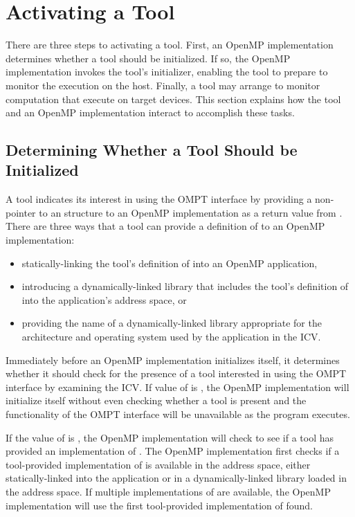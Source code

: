 \section{Activating a Tool}
\label{sec:ompt-initialization}

There are three steps to activating a tool. First, an OpenMP
implementation determines whether a tool should be initialized.  If
so, the OpenMP implementation invokes the tool's initializer, enabling
the tool to prepare to monitor the execution on the host. Finally, a
tool may arrange to monitor computation that execute 
on target devices. This section explains how the tool and an 
OpenMP implementation interact to accomplish these tasks.

\subsection{Determining Whether a Tool Should be Initialized}
\label{sec:ompt-check-tool}

A tool indicates its interest in using the OMPT interface 
by providing a non- pointer to an 
structure to an OpenMP implementation as a return value from 
. There are three ways
that a tool can provide a definition of  to an
OpenMP implementation:

\begin{itemize}
\item statically-linking the tool's definition of 
  into an OpenMP application, 
\item introducing a dynamically-linked library that includes the tool's definition
  of  into the application's address space, or 
\item providing the name of a dynamically-linked library appropriate
  for the architecture and operating system used by the application
  in the  ICV.
\end{itemize}

Immediately before an OpenMP implementation initializes itself, it
determines whether it should check for the presence of a tool
interested in using the OMPT interface by examining the 
ICV.  If value of  is , the OpenMP
implementation will initialize itself without even checking whether a
tool is present and the functionality of the OMPT interface will be
unavailable as the program executes.
 
If the value of  is , the OpenMP
implementation will check to see if a tool has provided an
implementation of .  The OpenMP implementation first
checks if a tool-provided implementation of  is
available in the address space, either statically-linked into the
application or in a dynamically-linked library loaded in the address
space. If multiple implementations of  are available,
the OpenMP implementation will use the first tool-provided
implementation of  found.

